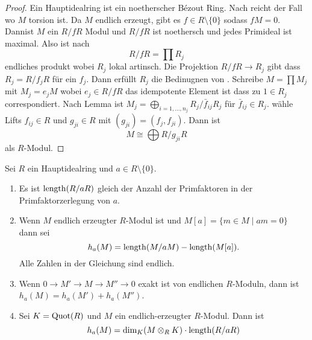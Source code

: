 \begin{proof}
    Ein Hauptidealring ist ein noetherscher Bézout Ring. Nach  reicht der Fall wo \(M\) torsion ist. Da \(M\) endlich erzeugt, gibt es \(f\in R\setminus\{0\}\) sodass \(fM=0\). Dannist \(M\) ein \(R/fR\) Modul und \(R/fR\) ist noethersch und jedes Primideal ist maximal. Also ist  nach  \[R/fR=\prod R_j\] endliches produkt wobei \(R_j\) lokal artinsch. Die Projektion \(R/fR\to R_j\) gibt dass \(R_j=R/f_jR\) für ein \(f_j\). Dann erfüllt \(R_j\) die Bedinugnen von . Schreibe \(M=\prod M_j\) mit \(M_j=e_jM\) wobei \(e_j\in R/fR\) das idempotente Element ist dass zu \(1\in R_j\) correspondiert.  Nach Lemma  ist \(M_j=\bigoplus_{i=1,\dots,n_j}R_j/\bar f_{ij}R_j\) für \(\bar f_{ij}\in R_j\). wähle Lifts \(f_{ij}\in R\) und \(g_{ji}\in R\) mit \((g_{ji})=(f_j,f_{ji})\). Dann ist \[M\cong\bigoplus R/g_{ji}R\] als \(R\)-Modul.
\end{proof}
\begin{Lemma}
    Sei \(R\) ein Hauptidealring und \(a\in R\setminus\{0\}\).
    \begin{enumerate}
        \item Es ist \(\operatorname{length}(R/aR)\) gleich der Anzahl der Primfaktoren in der Primfaktorzerlegung von \(a\).
        \item Wenn \(M\) endlich erzeugter \(R\)-Modul ist und \(M[a]=\{m\in M\mid am=0\}\) dann sei \[h_a(M)=\operatorname{length}(M/aM)-\operatorname{length}(M[a]).\] Alle Zahlen in der Gleichung sind endlich.
        \item Wenn \(0\to M'\to M\to M''\to 0\) exakt ist von endlichen \(R\)-Moduln, dann ist \(h_a(M)=h_a(M')+h_a(M'')\).
        \item Sei \(K=\operatorname{Quot}(R)\) und \(M\) ein endlich-erzeugter \(R\)-Modul. Dann ist 
        \[h_a(M)=\dim_K(M\otimes_RK)\cdot\operatorname{length}(R/aR)\]
    \end{enumerate}
\end{Lemma}
